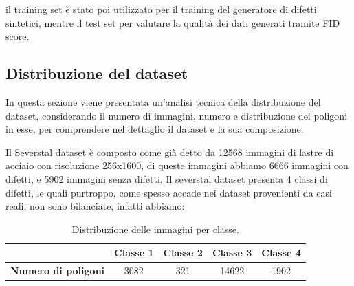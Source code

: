 il training set è stato poi utilizzato per il training del generatore di difetti sintetici, mentre il test set per valutare la qualità dei dati generati
tramite FID score.

\subsection{Distribuzione del dataset}

In questa sezione viene presentata un'analisi tecnica della distribuzione del dataset, considerando il numero di immagini,
numero e distribuzione dei poligoni in esse, per comprendere nel dettaglio il dataset e la sua composizione.

Il Severstal dataset è composto come già detto da 12568 immagini di lastre di acciaio con risoluzione 256x1600,
di queste immagini abbiamo 6666 immagini con difetti, e 5902 immagini senza difetti. Il severstal dataset presenta 4 classi di difetti,
le quali purtroppo, come spesso accade nei dataset provenienti da casi reali, non sono bilanciate, infatti abbiamo:

\begin{table}[H]
    \centering
    \begin{tabular}{|c|c|c|c|c|}
    \hline
            & \textbf{Classe 1} & \textbf{Classe 2} & \textbf{Classe 3} & \textbf{Classe 4} \\
    \hline
    \textbf{Numero di poligoni} & 3082 & 321 & 14622 & 1902 \\
    \hline
    \end{tabular}
    \caption{Distribuzione delle immagini per classe.}
    \label{tab:sd_polygons_distribution}
\end{table}


